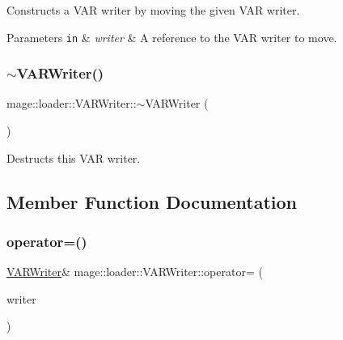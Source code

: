 Constructs a V\+AR writer by moving the given V\+AR writer.


\begin{DoxyParams}[1]{Parameters}
\mbox{\tt in}  & {\em writer} & A reference to the V\+AR writer to move. \\
\hline
\end{DoxyParams}
\hypertarget{classmage_1_1loader_1_1_v_a_r_writer_af908fe01c6754dabec6ed3c45b852b3b}{}\label{classmage_1_1loader_1_1_v_a_r_writer_af908fe01c6754dabec6ed3c45b852b3b} 
\subsubsection{\texorpdfstring{$\sim$\+V\+A\+R\+Writer()}{~VARWriter()}}
{\footnotesize\ttfamily mage\+::loader\+::\+V\+A\+R\+Writer\+::$\sim$\+V\+A\+R\+Writer (\begin{DoxyParamCaption}{ }\end{DoxyParamCaption})\hspace{0.3cm}{\ttfamily [default]}}

Destructs this V\+AR writer. 

\subsection{Member Function Documentation}
\hypertarget{classmage_1_1loader_1_1_v_a_r_writer_a6ffe21455dfc82f8d829d9cabe59ba53}{}\label{classmage_1_1loader_1_1_v_a_r_writer_a6ffe21455dfc82f8d829d9cabe59ba53} 
\subsubsection{\texorpdfstring{operator=()}{operator=()}\hspace{0.1cm}{\footnotesize\ttfamily [1/2]}}
{\footnotesize\ttfamily \hyperlink{classmage_1_1loader_1_1_v_a_r_writer}{V\+A\+R\+Writer}\& mage\+::loader\+::\+V\+A\+R\+Writer\+::operator= (\begin{DoxyParamCaption}\item[{const \hyperlink{classmage_1_1loader_1_1_v_a_r_writer}{V\+A\+R\+Writer} \&}]{writer }\end{DoxyParamCaption})\hspace{0.3cm}{\ttfamily [delete]}}

